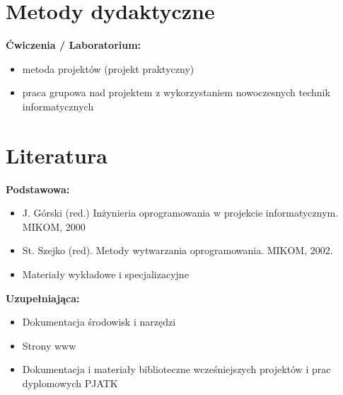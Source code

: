 \documentclass[12pt, a4paper]{article}
\begin{document}
\section{Metody dydaktyczne}

\textbf{Ćwiczenia / Laboratorium:}
\begin{itemize}
  \item metoda projektów (projekt praktyczny)
  \item praca grupowa nad projektem z wykorzystaniem nowoczesnych technik informatycznych
\end{itemize}
\vspace{4pt}


\section{Literatura}

\textbf{Podstawowa:}
\begin{itemize}
  \item J. Górski (red.) Inżynieria oprogramowania w projekcie informatycznym. MIKOM, 2000
  \item St. Szejko (red). Metody wytwarzania oprogramowania. MIKOM, 2002.
  \item Materiały wykładowe i specjalizacyjne
\end{itemize}

\textbf{Uzupełniająca:}
\begin{itemize}
  \item Dokumentacja środowisk i narzędzi
  \item Strony www
  \item Dokumentacja i materiały biblioteczne wcześniejszych projektów i prac dyplomowych PJATK
\end{itemize}
\end{document}
